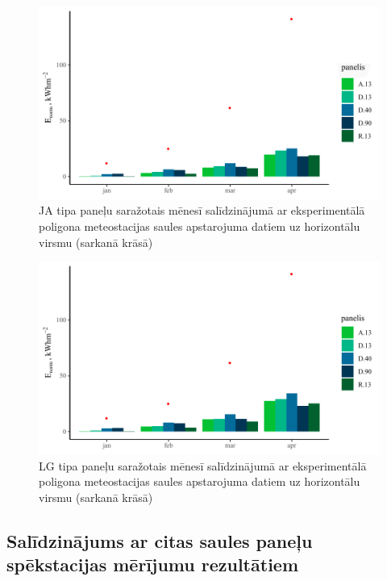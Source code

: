 \begin{figure}[h!]
    \centering
    \includegraphics[width=\linewidth]{figures/results/JAm2_w.pdf}
    \caption{JA tipa paneļu saražotais mēnesī salīdzinājumā ar eksperimentālā poligona meteostacijas saules apstarojuma datiem uz horizontālu virsmu (sarkanā krāsā)}
    \label{fig:ja}
\end{figure}
\begin{figure}[h!]
    \centering
    \includegraphics[width=\linewidth]{figures/results/LGm2_w.pdf}
    \caption{LG tipa paneļu saražotais mēnesī salīdzinājumā ar eksperimentālā poligona meteostacijas saules apstarojuma datiem uz horizontālu virsmu (sarkanā krāsā)}
    \label{fig:lg}
\end{figure}

\subsection{Salīdzinājums ar citas saules paneļu spēkstacijas mērījumu rezultātiem}

